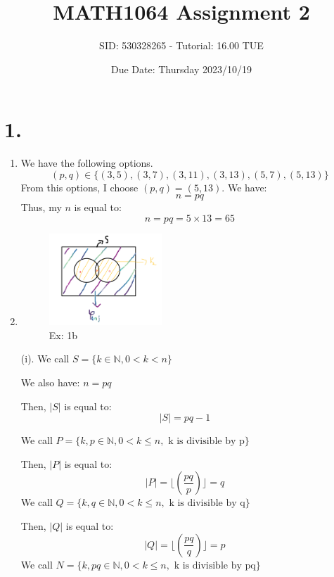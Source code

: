 \documentclass{article}
\title{MATH1064 Assignment 2}
\author{SID: 530328265 - Tutorial: 16.00 TUE}
\date{Due Date: Thursday 2023/10/19}
\begin{document}
	\maketitle
	\section*{1. }
	\begin{enumerate}[label=({\alph*})]
		\item We have the following options.
		\[ (p, q) \in \{(3, 5), (3, 7), (3, 11), (3, 13), (5, 7), (5, 13)\}\]
		From this options, I choose \((p, q) = (5, 13)\).
		We have:
		\[n = pq\]
		Thus, my \(n\) is equal to:
		\[n = pq = 5 \times 13 = 65\]
		\item 
		\begin{figure}[ht]
			\centering
				 \includegraphics[width=0.4\textwidth]{1b.png} 
				 \caption{Ex: 1b}
				 \label{Ex:1b}
		\end{figure}
		(i). We call \(S = \{k \in \mathbb{N}, 0 < k < n\}\)
	
		We also have: \(n = pq\)

		Then, \(\left| S \right|\) is equal to:
		\begin{equation}
			\left| S \right| = pq - 1 \quad \label{1:b:0}
		\end{equation}

		We call \(P = \{k, p \in \mathbb{N}, 0 < k \leq n, \text{ k is divisible by p} \}\) 

		Then, \(\left| P \right|\) is equal to:
		\begin{equation}
			\left| P \right| = \lfloor (\frac{pq}{p})  \rfloor = q\quad \label{1:b:1}
		\end{equation}
		We call \(Q = \{k, q \in \mathbb{N}, 0 < k \leq n, \text{ k is divisible by q} \}\)

		Then, \(\left| Q \right|\) is equal to:
		\begin{equation}
			\left| Q \right| = \lfloor (\frac{pq}{q})  \rfloor = p\quad \label{1:b:2}
		\end{equation}
		We call \(N = \{k, pq \in \mathbb{N}, 0 < k \leq n, \text{ k is divisible by pq} \}\)


\end{enumerate}
\end{document}

